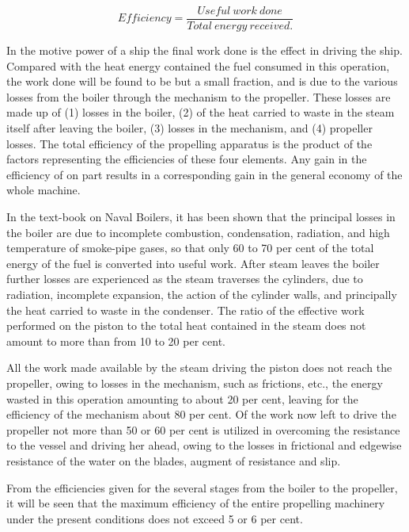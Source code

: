 \documentclass[11pt, a5paper]{book}
\begin{document}
\begin{equation*}
  Efficiency = \frac{Useful\:work\:done}{Total\:energy\:received.}
\end{equation*}

In the motive power of a ship the final work done is the effect in
driving the ship.  Compared with the heat energy contained the fuel
consumed in this operation, the work done will be found to be but a
small fraction, and is due to the various losses from the boiler
through the mechanism to the propeller.  These losses are made up of
(1) losses in the boiler, (2) of the heat carried to waste in the
steam itself after leaving the boiler, (3) losses in the mechanism,
and (4) propeller losses.  The total efficiency of the propelling
apparatus is the product of the factors representing the efficiencies
of these four elements.  Any gain in the efficiency of on part results
in a corresponding gain in the general economy of the whole
machine.\par

In the text-book on Naval Boilers, it has been shown that the
principal losses in the boiler are due to incomplete combustion,
condensation, radiation, and high temperature of smoke-pipe gases, so
that only 60 to 70 per cent of the total energy of the fuel is
converted into useful work.  After steam leaves the boiler further
losses are experienced as the steam traverses the cylinders, due to
radiation, incomplete expansion, the action of the cylinder walls, and
principally the heat carried to waste in the condenser.  The ratio of
the effective work performed on the piston to the total heat contained
in the steam does not amount to more than from 10 to 20 per cent.\par

All the work made available by the steam driving the piston does not
reach the propeller, owing to losses in the mechanism, such as
frictions, etc., the energy wasted in this operation amounting to
about 20 per cent, leaving for the efficiency of the mechanism about
80 per cent.  Of the work now left to drive the propeller not more
than 50 or 60 per cent is utilized in overcoming the resistance to the
vessel and driving her ahead, owing to the losses in frictional and
edgewise resistance of the water on the blades, augment of resistance
and slip.\par

From the efficiencies given for the several stages from the boiler to
the propeller, it will be seen that the maximum efficiency of the
entire propelling machinery under the present conditions does not
exceed 5 or 6 per cent.\par
\end{document}
